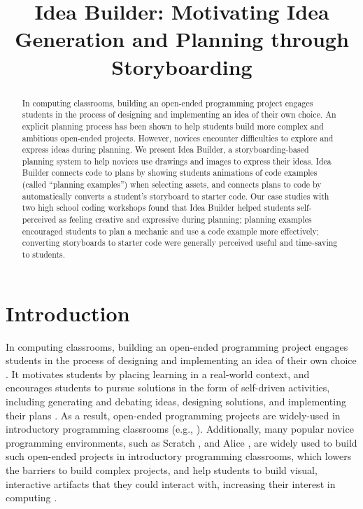 \begin{abstract}


In computing classrooms, building an open-ended programming project engages students in the process of designing and implementing an idea of their own choice. An explicit planning process has been shown to help students build more complex and ambitious open-ended projects. However, novices encounter difficulties to explore and express ideas during planning. We present Idea Builder, a storyboarding-based planning system to help novices use drawings and images to express their ideas. Idea Builder connects code to plans by showing students animations of code examples (called ``planning examples'') when selecting assets, and connects plans to code by automatically converts a student's storyboard to starter code. Our case studies with two high school coding workshops found that Idea Builder helped students self-perceived as feeling creative and expressive during planning; planning examples encouraged students to plan a mechanic and use a code example more effectively; converting storyboards to starter code were generally perceived useful and time-saving to students. 


\end{abstract}

\title{Idea Builder: Motivating Idea Generation and Planning through Storyboarding}
\maketitle

\section{Introduction}

In computing classrooms, building an open-ended programming project engages students in the process of designing and implementing an idea of their own choice \cite{grover2018what}. It motivates students by placing learning in a real-world context, and encourages students to pursue solutions in the form of self-driven activities, including generating and debating ideas, designing solutions, and implementing their plans \cite{blumenfeld1991motivating}. As a result, open-ended programming projects are widely-used in introductory programming classrooms (e.g., \cite{garcia2015beauty, grover2018what, franklin2020scratch}). Additionally, many popular novice programming environments, such as Scratch \cite{franklin2020scratch}, \snap \cite{garcia2015beauty} and Alice \cite{cooper2000alice}, are widely used to build such open-ended projects in introductory programming classrooms, which lowers the barriers to build complex projects, and help students to build visual, interactive artifacts that they could interact with, increasing their interest in computing \cite{guzdial2015learner}. 

